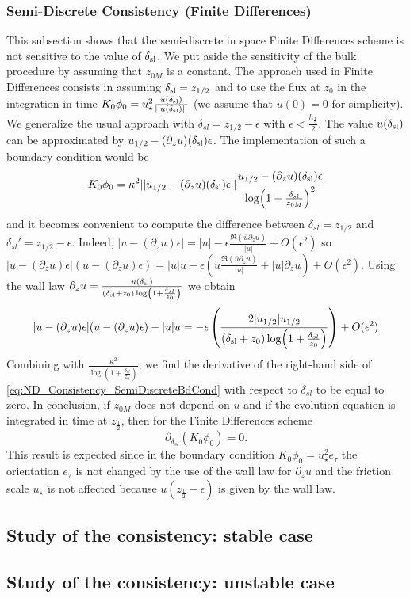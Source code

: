 \subsubsection{Semi-Discrete Consistency (Finite Differences)}
This subsection shows that the semi-discrete in space
Finite Differences
scheme is not sensitive to the value of $\delta_{\rm sl}$.
We put aside the sensitivity of the bulk procedure by
assuming that $z_{0M}$ is a constant.
%
The approach used in Finite Differences consists in assuming
$\delta_{\rm sl} = z_{1/2}$ and to use the flux at $z_0$ in
the integration in time
$K_0\phi_0 = u_\star^2
\frac{u(\delta_{\rm sl})}{||u(\delta_{\rm sl})||}$
(we assume that $u(0)=0$ for simplicity).
We generalize the usual approach with
$\delta_{sl} = z_{1/2} - \epsilon$ with
$\epsilon < \frac{h_{\frac{1}{2}}}{2}$. 
The value $u(\delta_{\rm sl})$ can be approximated
by $u_{1/2} - (\partial_z u)(\delta_{\rm sl})\epsilon$.
The implementation of such a boundary condition would be
\begin{equation}
	\label{eq:ND_Consistency_SemiDiscreteBdCond}
K_0\phi_0 = 
\kappa^2 ||u_{1/2} - (\partial_z u)(\delta_{\rm sl})\epsilon ||
	\frac{u_{1/2} - (\partial_z u)(\delta_{\rm sl})\epsilon 
}{\log(1+\frac{\delta_{sl}}{z_{0M}})^2}
\end{equation}
and it becomes convenient to compute the difference between
$\delta_{sl}=z_{1/2}$ and $\delta_{sl}'=z_{1/2}-\epsilon$.
Indeed,
$|u - (\partial_z u) \epsilon| = |u| -
\epsilon \frac{\mathfrak{R}(\overline{u} \partial_z u)}{|u|}
+ O(\epsilon^2)$ so
$|u - (\partial_z u) \epsilon|(u - (\partial_z u) \epsilon) =
|u|u -
\epsilon \left(
u\frac{\mathfrak{R}(\overline{u} \partial_z u)}{|u|}
+ |u| \partial_z u
\right)
+ O(\epsilon^2)$.
Using the wall law
$\partial_z u=\frac{u(\delta_{\rm sl})}{(\delta_{\rm sl} + z_0)
\log(1+\frac{\delta_{sl}}{z_0})}$ we obtain 
\begin{equation}
|u - (\partial_z u) \epsilon|(u - (\partial_z u) \epsilon) - |u|u =
	- \epsilon \left(\frac{2|u_{1/2}|u_{1/2}}
	{(\delta_{\rm sl} + z_0) \log(1+\frac{\delta_{sl}}{z_0})}
	\right)+ O(\epsilon^2)
\end{equation}
Combining with $\frac{\kappa^2}{\log(1+\frac{\delta_{sl}}{z_0})}$,
we find the derivative of the right-hand side of
\eqref{eq:ND_Consistency_SemiDiscreteBdCond} with respect to
$\delta_{sl}$ to be equal to zero.
In conclusion, if $z_{0M}$ does not depend on $u$ and if
the evolution equation is integrated in time at $z_\frac{1}{2}$,
then for the Finite Differences scheme
\begin{equation}
	\partial_{\delta_{sl}} (K_0 \phi_0) = 0.
\end{equation}
This result is expected since in the boundary condition
$K_0 \phi_0 = u_\star^2 e_\tau$ the orientation $e_\tau$ is
not changed by the use of the wall law for $\partial_z u$
and the friction scale $u_\star$ is not affected because
$u(z_\frac{1}{2} - \epsilon)$ is given by the wall law.
\subsection{Study of the consistency: stable case}
\subsection{Study of the consistency: unstable case}
